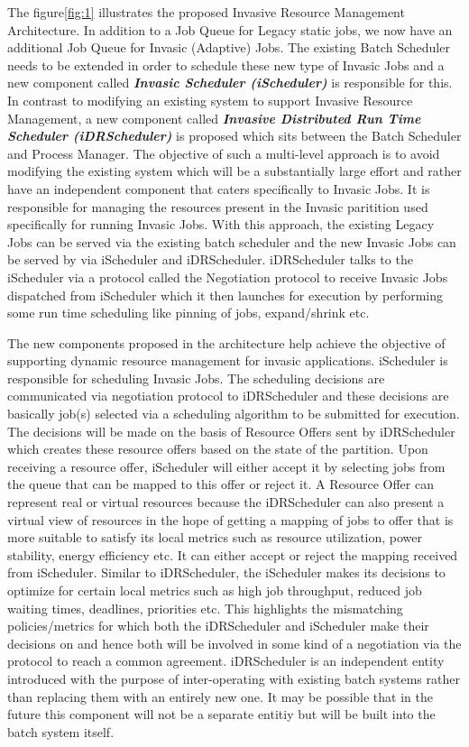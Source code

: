 The figure\ref{fig:1} illustrates the proposed Invasive Resource Management Architecture. In addition to a Job Queue for Legacy static jobs, we now have an additional Job Queue for Invasic (Adaptive) Jobs. The existing Batch Scheduler needs to be extended in order to schedule these new type of Invasic Jobs and a new component called \textbf{\textit{Invasic Scheduler (iScheduler)}} is responsible for this. In contrast to modifying an existing system to support Invasive Resource Management, a new component called \textbf{\textit{Invasive Distributed Run Time Scheduler (iDRScheduler)}} is proposed which sits between the Batch Scheduler and Process Manager. The objective of such a multi-level approach is to avoid modifying the existing system which will be a substantially large effort and rather have an independent component that caters specifically to Invasic Jobs. It is responsible for managing the resources present in the Invasic paritition used specifically for running Invasic Jobs. With this approach, the existing Legacy Jobs can be served via the existing batch scheduler and the new Invasic Jobs can be served by via iScheduler and iDRScheduler. iDRScheduler talks to the iScheduler via a protocol called the Negotiation protocol to receive Invasic Jobs dispatched from iScheduler which it then launches for execution by performing some run time scheduling like pinning of jobs, expand/shrink etc.\\ \par
\noindent
The new components proposed in the architecture help achieve the objective of supporting dynamic resource management for invasic applications. iScheduler is responsible for scheduling Invasic Jobs. The scheduling decisions are communicated via negotiation protocol to iDRScheduler and these decisions are basically job(s) selected via a scheduling algorithm to be submitted for execution. The decisions will be made on the basis of Resource Offers sent by iDRScheduler which creates these resource offers based on the state of the partition. Upon receiving a resource offer, iScheduler will either accept it by selecting jobs from the queue that can be mapped to this offer or reject it. A Resource Offer can represent real or virtual resources because the iDRScheduler can also present a virtual view of resources in the hope of getting a mapping of jobs to offer that is more suitable to satisfy its local metrics such as resource utilization, power stability, energy efficiency etc. It can either accept or reject the mapping received from iScheduler. Similar to iDRScheduler, the iScheduler makes its decisions to optimize for certain local metrics such as high job throughput, reduced job waiting times, deadlines, priorities etc. This highlights the mismatching policies/metrics for which both the iDRScheduler and iScheduler make their decisions on and hence both will be involved in some kind of a negotiation via the protocol to reach a common agreement. iDRScheduler is an independent entity introduced with the purpose of inter-operating with existing batch systems rather than replacing them with an entirely new one. It may be possible that in the future this component will not be a separate entitiy but will be built into the batch system itself.\\ \par
